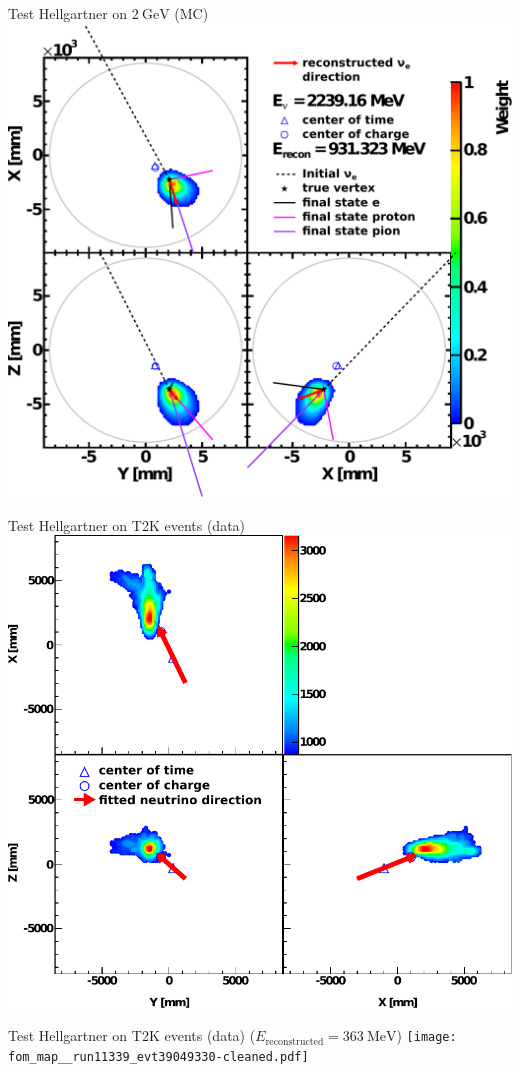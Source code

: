 \documentclass[14pt]{beamer}
\begin{document}
\begin{frame}{Test Hellgartner on
	$\SI{2}{\giga\electronvolt}$ \Pnue (MC)}
	\centering
	\includegraphics[width=0.75\linewidth]{hellgartner_reconstruction_2gev_nue_klg4sim.pdf}
\end{frame}

\begin{frame}{Test Hellgartner on T2K events (data)}
	\centering
	\includegraphics[width=0.75\linewidth]{fom_map__run11268_evt28729171-cleaned.pdf}
\end{frame}

\begin{frame}{Test Hellgartner on T2K events (data)}
	{($E_{\text{reconstructed}} = \SI{363}{\mega\electronvolt}$)}
	\centering
	\texttt{[image: fom\_map\_\_run11339\_evt39049330-cleaned.pdf]}
\end{frame}
\end{document}
